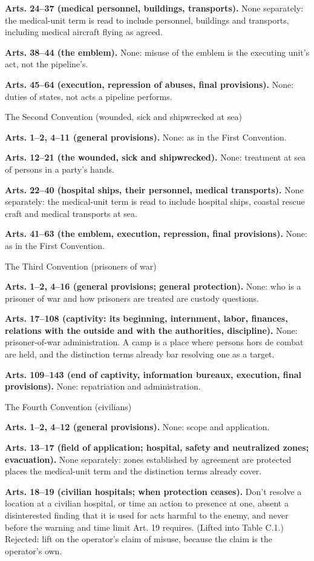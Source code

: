 \textbf{Arts. 24–37 (medical personnel, buildings, transports).} None separately: the medical-unit term is read to include personnel, buildings and transports, including medical aircraft flying as agreed.

\textbf{Arts. 38–44 (the emblem).} None: misuse of the emblem is the executing unit's act, not the pipeline's.

\textbf{Arts. 45–64 (execution, repression of abuses, final provisions).} None: duties of states, not acts a pipeline performs.

The Second Convention (wounded, sick and shipwrecked at sea)

\textbf{Arts. 1–2, 4–11 (general provisions).} None: as in the First Convention.

\textbf{Arts. 12–21 (the wounded, sick and shipwrecked).} None: treatment at sea of persons in a party's hands.

\textbf{Arts. 22–40 (hospital ships, their personnel, medical transports).} None separately: the medical-unit term is read to include hospital ships, coastal rescue craft and medical transports at sea.

\textbf{Arts. 41–63 (the emblem, execution, repression, final provisions).} None: as in the First Convention.

The Third Convention (prisoners of war)

\textbf{Arts. 1–2, 4–16 (general provisions; general protection).} None: who is a prisoner of war and how prisoners are treated are custody questions.

\textbf{Arts. 17–108 (captivity: its beginning, internment, labor, finances, relations with the outside and with the authorities, discipline).} None: prisoner-of-war administration. A camp is a place where persons hors de combat are held, and the distinction terms already bar resolving one as a target.

\textbf{Arts. 109–143 (end of captivity, information bureaux, execution, final provisions).} None: repatriation and administration.

The Fourth Convention (civilians)

\textbf{Arts. 1–2, 4–12 (general provisions).} None: scope and application.

\textbf{Arts. 13–17 (field of application; hospital, safety and neutralized zones; evacuation).} None separately: zones established by agreement are protected places the medical-unit term and the distinction terms already cover.

\textbf{Arts. 18–19 (civilian hospitals; when protection ceases).} Don't resolve a location at a civilian hospital, or time an action to presence at one, absent a disinterested finding that it is used for acts harmful to the enemy, and never before the warning and time limit Art. 19 requires. (Lifted into Table C.1.) Rejected: lift on the operator's claim of misuse, because the claim is the operator's own.

